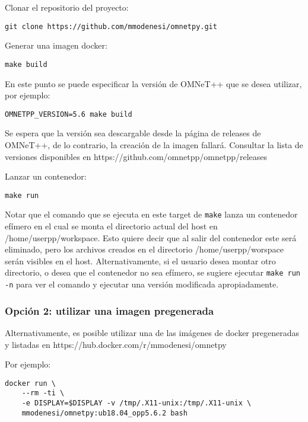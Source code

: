 \documentclass[]{article}
\begin{document}
Clonar el repositorio del proyecto:

\begin{verbatim}
git clone https://github.com/mmodenesi/omnetpy.git
\end{verbatim}

Generar una imagen docker:

\begin{verbatim}
make build
\end{verbatim}

En este punto se puede especificar la versión de OMNeT++ que se desea utilizar, por ejemplo:

\begin{verbatim}
OMNETPP_VERSION=5.6 make build
\end{verbatim}

Se espera que la versión sea descargable desde la página de releases de
OMNeT++, de lo contrario, la creación de la imagen fallará. Consultar la lista
de versiones disponibles en https://github.com/omnetpp/omnetpp/releases

Lanzar un contenedor:

\begin{verbatim}
make run
\end{verbatim}

Notar que el comando que se ejecuta en este target de \verb!make! lanza un
contenedor efímero en el cual se monta el directorio actual del host en
/home/userpp/workspace. Esto quiere decir que al salir del contenedor este será
eliminado, pero los archivos creados en el directorio /home/userpp/worspace
serán visibles en el host. Alternativamente, si el usuario desea montar otro
directorio, o desea que el contenedor no sea efímero, se sugiere ejecutar
\verb!make run -n! para ver el comando y ejecutar una versión modificada
apropiadamente.

\subsubsection{Opción 2: utilizar una imagen pregenerada}

Alternativamente, es posible utilizar una de las imágenes de docker
pregeneradas y listadas en https://hub.docker.com/r/mmodenesi/omnetpy

Por ejemplo:

\begin{verbatim}
docker run \
    --rm -ti \
    -e DISPLAY=$DISPLAY -v /tmp/.X11-unix:/tmp/.X11-unix \    
    mmodenesi/omnetpy:ub18.04_opp5.6.2 bash
\end{verbatim}
\end{document}

